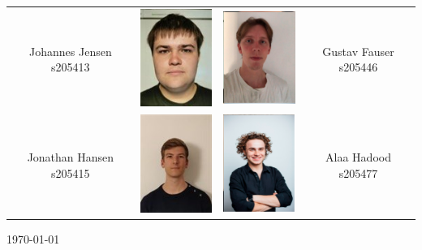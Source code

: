 \begin{titlepage}
\begin{center}
\begin{tabular}[!c]{cccc}
 Johannes Jensen
s205413 & \includegraphics[width=2.75cm]{root/johannes.png} &   \includegraphics[width=2.75cm]{root/gustav.PNG} & Gustav Fauser s205446 \\

Jonathan Hansen	
s205415 &
 \includegraphics[width=2.75cm]{root/jonathan.png} &   \includegraphics[width=2.75cm]{root/alaa.PNG} & Alaa Hadood 
s205477 \\

\end{tabular}

\vspace{.5cm}
\centering \today %
\end{center}
\end{titlepage}
